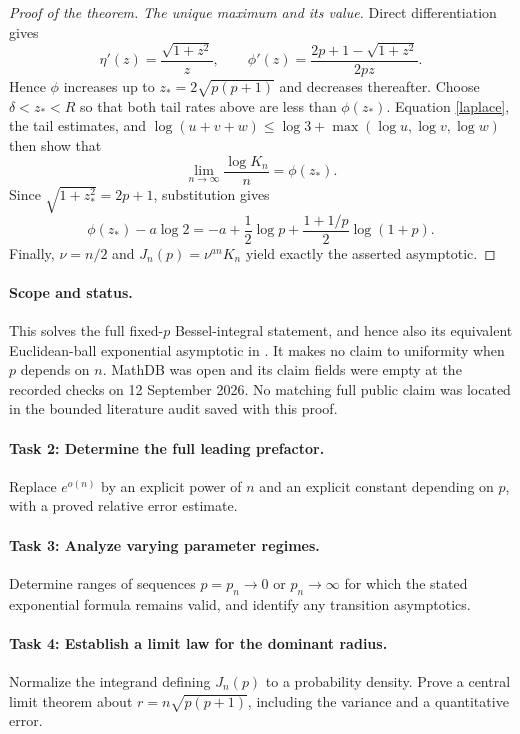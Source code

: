 \documentclass[11pt]{article}
\begin{document}
\begin{proof}[Proof of the theorem]
\emph{The unique maximum and its value.}
Direct differentiation gives
\[
 \eta'(z)=\frac{\sqrt{1+z^2}}{z},\qquad
 \phi'(z)=\frac{2p+1-\sqrt{1+z^2}}{2pz}.
\]
Hence \(\phi\) increases up to
\(z_*=2\sqrt{p(p+1)}\) and decreases thereafter.
Choose \(\delta<z_*<R\) so that both tail rates above are less than
\(\phi(z_*)\).
Equation \eqref{laplace}, the tail estimates, and
\(\log(u+v+w)\le\log3+\max(\log u,\log v,\log w)\)
then show that
\[
 \lim_{n\to\infty}\frac{\log K_n}{n}=\phi(z_*).
\]
Since \(\sqrt{1+z_*^2}=2p+1\), substitution gives
\[
 \phi(z_*)-a\log2
 =-a+\frac12\log p+\frac{1+1/p}{2}\log(1+p).
\]
Finally, \(\nu=n/2\) and \(J_n(p)=\nu^{an}K_n\) yield exactly
the asserted asymptotic.
\end{proof}

\paragraph{Scope and status.}
This solves the full fixed-\(p\) Bessel-integral statement, and hence
also its equivalent Euclidean-ball exponential asymptotic in
\cite[Conjecture 5.1]{M}. It makes no claim to uniformity when \(p\)
depends on \(n\). MathDB was open and its claim fields were empty at the
recorded checks on 12 September 2026. No matching full public claim was
located in the bounded literature audit saved with this proof.

\paragraph{Task 2: Determine the full leading prefactor.}
Replace \(e^{o(n)}\) by an explicit power of \(n\) and an explicit
constant depending on \(p\), with a proved relative error estimate.

\paragraph{Task 3: Analyze varying parameter regimes.}
Determine ranges of sequences \(p=p_n\to0\) or \(p_n\to\infty\)
for which the stated exponential formula remains valid, and identify
any transition asymptotics.

\paragraph{Task 4: Establish a limit law for the dominant radius.}
Normalize the integrand defining \(J_n(p)\) to a probability density.
Prove a central limit theorem about
\(r=n\sqrt{p(p+1)}\), including the variance and a quantitative error.
\end{document}
